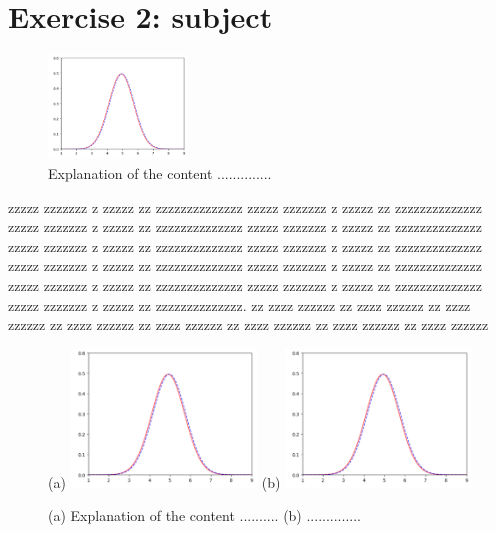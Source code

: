 
\chapter*{Exercise 2: subject}

\begin{figure}
  \centering
  \includegraphics[width=0.33\textwidth]{./FIG/Gaussiane.png}
\caption{Explanation of the content ..............}
\label{fig:2.1}
\end{figure}

zzzzz zzzzzzz z zzzzz zz zzzzzzzzzzzzzz
zzzzz zzzzzzz z zzzzz zz zzzzzzzzzzzzzz
zzzzz zzzzzzz z zzzzz zz zzzzzzzzzzzzzz
zzzzz zzzzzzz z zzzzz zz zzzzzzzzzzzzzz
zzzzz zzzzzzz z zzzzz zz zzzzzzzzzzzzzz
zzzzz zzzzzzz z zzzzz zz zzzzzzzzzzzzzz
zzzzz zzzzzzz z zzzzz zz zzzzzzzzzzzzzz
zzzzz zzzzzzz z zzzzz zz zzzzzzzzzzzzzz
zzzzz zzzzzzz z zzzzz zz zzzzzzzzzzzzzz
zzzzz zzzzzzz z zzzzz zz zzzzzzzzzzzzzz
zzzzz zzzzzzz z zzzzz zz zzzzzzzzzzzzzz.
zz zzzz zzzzzz 
zz zzzz zzzzzz
zz zzzz zzzzzz
zz zzzz zzzzzz
zz zzzz zzzzzz
zz zzzz zzzzzz
zz zzzz zzzzzz
zz zzzz zzzzzz


\begin{figure}[b!]
\centering
(a)
\includegraphics[width=0.44\textwidth]{./FIG/Gaussiane.png}
(b)
\includegraphics[width=0.44\textwidth]{./FIG/Gaussiane.png}
\caption{(a) Explanation of the content .......... (b) ..............}
\label{fig:2.2}
\end{figure}

